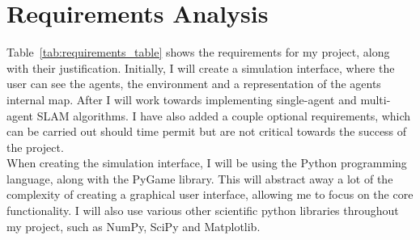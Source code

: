 \documentclass[12pt]{article}
\begin{document}


\section{Requirements Analysis}
Table~\ref{tab:requirements_table} shows the requirements for my project, along with their justification. Initially, I will
create a simulation interface, where the user can see the agents, the environment and a representation of the agents internal
map. After I will work towards implementing single-agent and multi-agent SLAM algorithms. I have also added a couple optional
requirements, which can be carried out should time permit but are not critical towards the success of the project.\\
When creating the simulation interface, I will be using the Python programming language, along with the PyGame library. This
will abstract away a lot of the complexity of creating a graphical user interface, allowing me to focus on the core functionality.
I will also use various other scientific python libraries throughout my project, such as NumPy, SciPy and Matplotlib.\\
\end{document}
